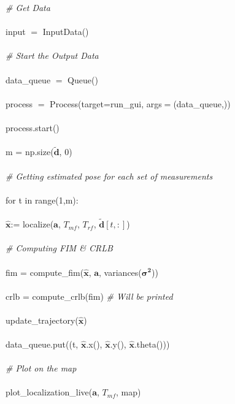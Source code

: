 \documentclass[12pt, titlepage]{article}
\begin{document}
\noindent \textit{\# Get Data}\\\\
\noindent input $=$ InputData()\\\\
\noindent \textit{\# Start the Output Data}\\\\
\noindent data\_queue $=$ Queue()\\\\
\noindent process $=$ Process(target=run\_gui, args$=$(data\_queue,))\\\\
\noindent process.start()\\\\
\noindent m = np.size($\mathbf{\tilde{d}}$, 0)\\\\
\noindent \textit{\# Getting estimated pose for each set of measurements}\\\\
\noindent for t in range(1,m): \\\\
\indent $\mathbf{\hat{x}}$:= localize($\mathbf{a}$, $T_{mf}$, $T_{rf}$, $\mathbf{\tilde{d}}[t,:]$)\\\\
\indent \textit{\# Computing FIM \& CRLB} \\\\
\indent  fim = compute\_fim($\mathbf{\hat{x}}$, $\mathbf{a}$, variances($\boldsymbol{\sigma^2}$))\\\\
\indent  crlb = compute\_crlb(fim) \textit{\# Will be printed}\\\\
\indent update\_trajectory($\mathbf{\hat{x}}$)\\\\
\indent data\_queue.put((t, $\mathbf{\hat{x}}$.x(), $\mathbf{\hat{x}}$.y(), $\mathbf{\hat{x}}$.theta()))\\\\
\noindent \textit{\# Plot on the map}\\\\
\noindent plot\_localization\_live($\mathbf{a}$, $T_{mf}$, map)

\end{document}
